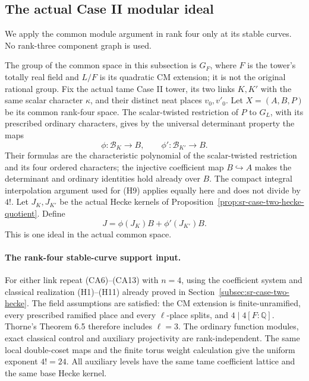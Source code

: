 \subsection{The actual Case II modular ideal}
\label{subsec:sr-case-II-actual-pm}

We apply the common module argument in rank four only at its
stable curves. No rank-three component graph is used.

The group of the common space in this subsection is \(G_F\),
where \(F\) is the tower's totally real field and \(L/F\) is
its quadratic CM extension; it is not the original rational group.
Fix the actual tame Case II tower, its two links \(K,K'\) with
the same scalar character \(\kappa\), and their distinct neat
places \(v_0,v'_0\).
Let \(X=(A,B,P)\) be its common rank-four space.
The scalar-twisted restriction of \(P\) to \(G_L\), with its
prescribed ordinary characters, gives by the universal determinant
property the maps
\[
 \phi:\mathcal B_K\longrightarrow B,\qquad
 \phi':\mathcal B_{K'}\longrightarrow B.
\]
Their formulas are the characteristic polynomial of the
scalar-twisted restriction and its four ordered characters;
the injective coefficient map \(B\hookrightarrow A\) makes
the determinant and ordinary identities hold already over \(B\).
The compact integral interpolation argument used for (H9)
applies equally here and does not divide by \(4!\).
Let \(J_K,J_{K'}\) be the actual Hecke kernels of
Proposition~\ref{prop:sr-case-two-hecke-quotient}. Define
\[
                  J=\phi(J_K)B+\phi'(J_{K'})B.             \tag{R4M1}
\]
This is one ideal in the actual common space.

\paragraph{The rank-four stable-curve support input.}
For either link repeat (CA6)--(CA13) with \(n=4\), using
the coefficient system and classical realization
(H1)--(H11) already proved in
Section~\ref{subsec:sr-case-two-hecke}.
The field assumptions are satisfied: the CM extension is
finite-unramified, every prescribed ramified place and every
\(\ell\)-place splits, and \(4\mid4[F:\mathbb Q]\).
Thorne's Theorem 6.5 therefore includes \(\ell=3\).
The ordinary function modules, exact classical control and
auxiliary projectivity are rank-independent.
The same local double-coset maps and the finite torus weight
calculation give the uniform exponent \(4!=24\).
All auxiliary levels have the same tame coefficient lattice
and the same base Hecke kernel.

